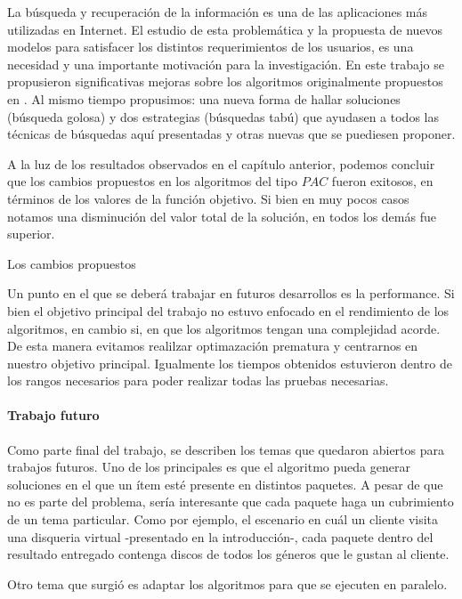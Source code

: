 La búsqueda y recuperación de la información es una de las aplicaciones más utilizadas en Internet. El estudio de esta problemática y la propuesta de nuevos modelos para satisfacer los distintos requerimientos de los usuarios, es una necesidad y una importante motivación para la investigación. En este trabajo se propusieron significativas mejoras sobre los algoritmos originalmente propuestos en \cite{journals/tkde/Amer-YahiaBCFMZ14}. Al mismo tiempo propusimos: una nueva forma de hallar soluciones (búsqueda golosa) y dos estrategias (búsquedas tabú) que ayudasen a todos las técnicas de búsquedas aquí presentadas y otras nuevas que se puediesen proponer.

A la luz de los resultados observados en el capítulo anterior, podemos concluir que los cambios propuestos en los algoritmos del tipo $PAC$ fueron exitosos, en términos de los valores de la función objetivo. Si bien en muy pocos casos notamos una disminución del valor total de la solución, en todos los demás fue superior.

Los cambios propuestos 



Un punto en el que se deberá trabajar en futuros desarrollos es la performance. Si bien el objetivo principal del trabajo no estuvo enfocado en el rendimiento de los algoritmos, en cambio si, en que los algoritmos tengan una complejidad acorde. De esta manera evitamos realilzar optimazación prematura y centrarnos en nuestro objetivo principal. Igualmente los tiempos obtenidos estuvieron dentro de los rangos necesarios para poder realizar todas las pruebas necesarias.

\paragraph{Trabajo futuro} Como parte final del trabajo, se describen los temas que quedaron abiertos para trabajos futuros. Uno de los principales es que el algoritmo pueda generar soluciones en el que un ítem esté presente en distintos paquetes. A pesar de que no es parte del problema, sería interesante que cada paquete haga un cubrimiento de un tema particular. Como por ejemplo, el escenario en cuál un cliente visita una disqueria virtual -presentado en la introducción-, cada paquete dentro del resultado entregado contenga discos de todos los géneros que le gustan al cliente.

Otro tema que surgió es adaptar los algoritmos para que se ejecuten en paralelo.

